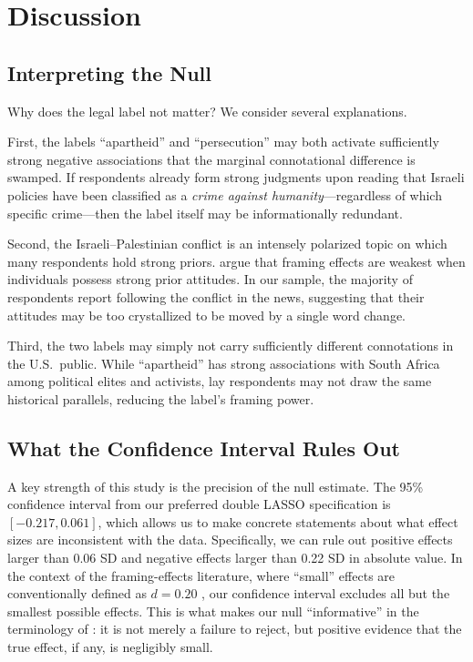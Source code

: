 \documentclass[12pt]{article}
\begin{document}
\section{Discussion}
\label{sec:discussion}

\subsection{Interpreting the Null}

Why does the legal label not matter? We consider several explanations.

First, the labels ``apartheid'' and ``persecution'' may both activate sufficiently strong negative associations that the marginal connotational difference is swamped. If respondents already form strong judgments upon reading that Israeli policies have been classified as a \emph{crime against humanity}---regardless of which specific crime---then the label itself may be informationally redundant.

Second, the Israeli--Palestinian conflict is an intensely polarized topic on which many respondents hold strong priors. \citet{chong2007framing} argue that framing effects are weakest when individuals possess strong prior attitudes. In our sample, the majority of respondents report following the conflict in the news, suggesting that their attitudes may be too crystallized to be moved by a single word change.

Third, the two labels may simply not carry sufficiently different connotations in the U.S.\ public. While ``apartheid'' has strong associations with South Africa among political elites and activists, lay respondents may not draw the same historical parallels, reducing the label's framing power.

\subsection{What the Confidence Interval Rules Out}

A key strength of this study is the precision of the null estimate. The 95\% confidence interval from our preferred double LASSO specification is $[-0.217, 0.061]$, which allows us to make concrete statements about what effect sizes are inconsistent with the data. Specifically, we can rule out positive effects larger than 0.06 SD and negative effects larger than 0.22 SD in absolute value. In the context of the framing-effects literature, where ``small'' effects are conventionally defined as $d = 0.20$ \citep{cohen1988statistical}, our confidence interval excludes all but the smallest possible effects. This is what makes our null ``informative'' in the terminology of \citet{lakens2017equivalence}: it is not merely a failure to reject, but positive evidence that the true effect, if any, is negligibly small.
\end{document}
